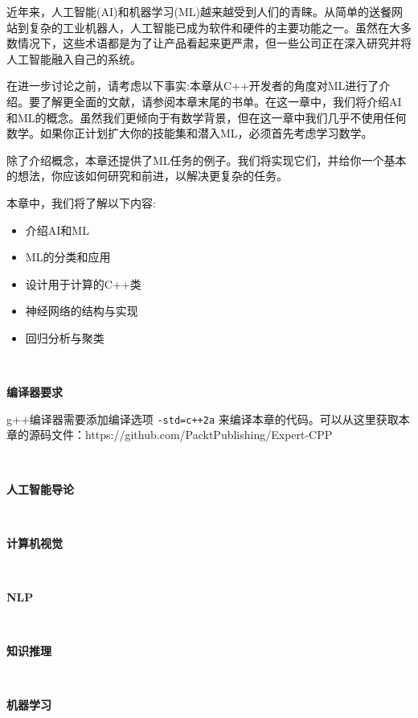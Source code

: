近年来，人工智能(AI)和机器学习(ML)越来越受到人们的青睐。从简单的送餐网站到复杂的工业机器人，人工智能已成为软件和硬件的主要功能之一。虽然在大多数情况下，这些术语都是为了让产品看起来更严肃，但一些公司正在深入研究并将人工智能融入自己的系统。 \par
在进一步讨论之前，请考虑以下事实:本章从C++开发者的角度对ML进行了介绍。要了解更全面的文献，请参阅本章末尾的书单。在这一章中，我们将介绍AI和ML的概念。虽然我们更倾向于有数学背景，但在这一章中我们几乎不使用任何数学。如果你正计划扩大你的技能集和潜入ML，必须首先考虑学习数学。 \par
除了介绍概念，本章还提供了ML任务的例子。我们将实现它们，并给你一个基本的想法，你应该如何研究和前进，以解决更复杂的任务。 \par

本章中，我们将了解以下内容: \par

\begin{itemize}
	\item 介绍AI和ML
	\item ML的分类和应用
	\item 设计用于计算的C++类
	\item 神经网络的结构与实现
	\item 回归分析与聚类
\end{itemize}

\noindent\textbf{}\ \par
\textbf{编译器要求} \ \par
g++编译器需要添加编译选项 \texttt{-std=c++2a} 来编译本章的代码。可以从这里获取本章的源码文件：https:/​/github.​com/PacktPublishing/Expert-CPP \par

\noindent\textbf{}\ \par
\textbf{人工智能导论} \ \par

\noindent\textbf{}\ \par
\textbf{计算机视觉} \ \par

\noindent\textbf{}\ \par
\textbf{NLP} \ \par

\noindent\textbf{}\ \par
\textbf{知识推理} \ \par

\noindent\textbf{}\ \par
\textbf{机器学习} \ \par

